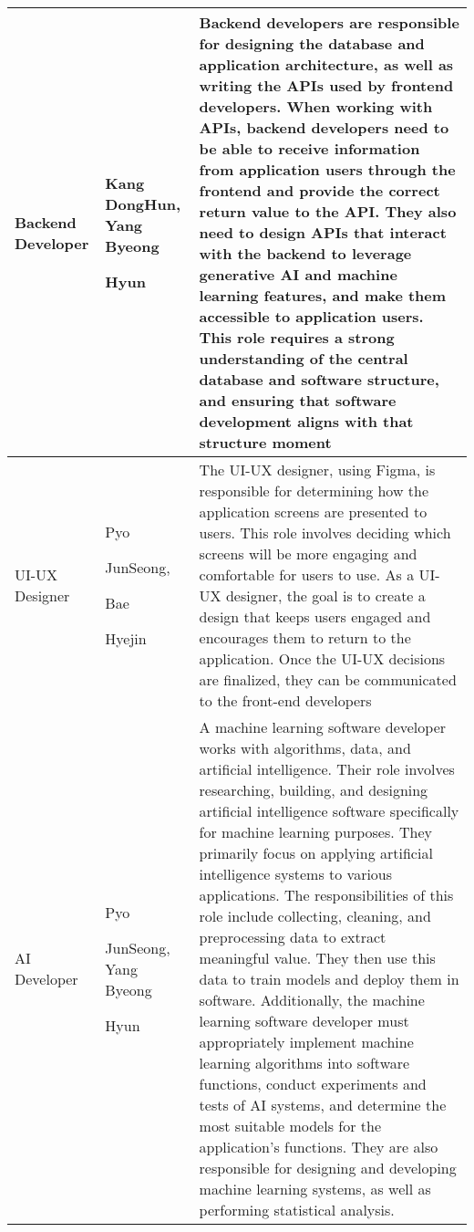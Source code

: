 \documentclass[conference]{IEEEtran}
\begin{document}
\begin{enumerate}
\begin{table}
\def\arraystretch{1.24} \small 

\begin{tabular}{|p{1.2cm}|p{1.2cm}|p{5.2cm}|}
    \hline
    Backend Developer & Kang DongHun,  Yang Byeong \par Hyun & Backend developers are responsible for designing the database and application architecture, as well as writing the APIs used by frontend developers. When working with APIs, backend developers need to be able to receive information from application users through the frontend and provide the correct return value to the API. They also need to design APIs that interact with the backend to leverage generative AI and machine learning features, and make them accessible to application users. This role requires a strong understanding of the central database and software structure, and ensuring that software development aligns with that structure moment \\ 
    \hline
    UI-UX Designer & Pyo \par JunSeong, \par Bae \par Hyejin & The UI-UX designer, using Figma, is responsible for determining how the application screens are presented to users. This role involves deciding which screens will be more engaging and comfortable for users to use. As a UI-UX designer, the goal is to create a design that keeps users engaged and encourages them to return to the application. Once the UI-UX decisions are finalized, they can be communicated to the front-end developers \\ 
    \hline
    AI Developer & Pyo \par JunSeong, Yang Byeong \par Hyun & A machine learning software developer works with algorithms, data, and artificial intelligence. Their role involves researching, building, and designing artificial intelligence software specifically for machine learning purposes. They primarily focus on applying artificial intelligence systems to various applications. The responsibilities of this role include collecting, cleaning, and preprocessing data to extract meaningful value. They then use this data to train models and deploy them in software. Additionally, the machine learning software developer must appropriately implement machine learning algorithms into software functions, conduct experiments and tests of AI systems, and determine the most suitable models for the application’s functions. They are also responsible for designing and developing machine learning systems, as well as performing statistical analysis. \\

\end{tabular}
\end{table}
\end{enumerate}
\end{document}
